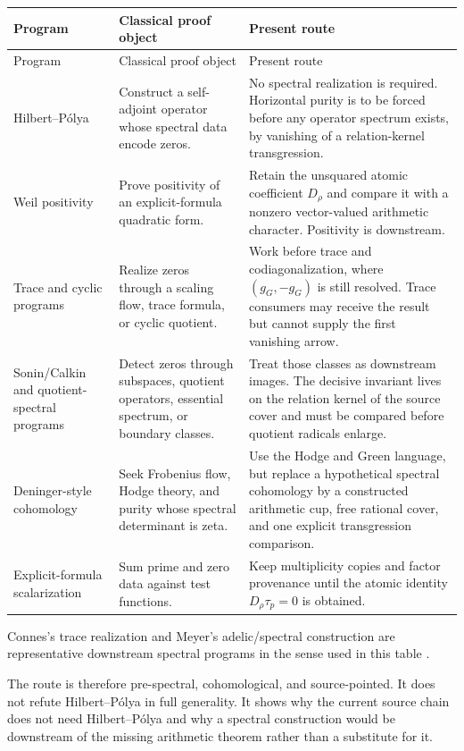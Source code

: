 \documentclass[11pt]{article}
\theoremstyle{definition}
\theoremstyle{remark}
\numberwithin{equation}{section}
\begin{document}
\begin{longtable}{>{\raggedright\arraybackslash}p{}
                  >{\raggedright\arraybackslash}p{}
                  >{\raggedright\arraybackslash}p{}}
\toprule
Program & Classical proof object & Present route \\
\midrule
\endfirsthead
\toprule
Program & Classical proof object & Present route \\
\midrule
\endhead
Hilbert--P\'olya & Construct a self-adjoint operator whose spectral data
encode zeros. & No spectral realization is required.  Horizontal purity is
to be forced before any operator spectrum exists, by vanishing of a
relation-kernel transgression.\\
Weil positivity & Prove positivity of an explicit-formula quadratic form. &
Retain the unsquared atomic coefficient $D_\rho$ and compare it with a
nonzero vector-valued arithmetic character.  Positivity is downstream.\\
Trace and cyclic programs & Realize zeros through a scaling flow, trace
formula, or cyclic quotient. & Work before trace and codiagonalization,
where $(g_G,-g_G)$ is still resolved.  Trace consumers may receive the
result but cannot supply the first vanishing arrow.\\
Sonin/Calkin and quotient-spectral programs & Detect zeros through
subspaces, quotient operators, essential spectrum, or boundary classes. &
Treat those classes as downstream images.  The decisive invariant lives on
the relation kernel of the source cover and must be compared before quotient
radicals enlarge.\\
Deninger-style cohomology & Seek Frobenius flow, Hodge theory, and purity
whose spectral determinant is zeta. & Use the Hodge and Green language, but
replace a hypothetical spectral cohomology by a constructed arithmetic cup,
free rational cover, and one explicit transgression comparison.\\
Explicit-formula scalarization & Sum prime and zero data against test
functions. & Keep multiplicity copies and factor provenance until the
atomic identity $D_\rho\tau_p=0$ is obtained.\\
\bottomrule
\end{longtable}

Connes's trace realization and Meyer's adelic/spectral construction are
representative downstream spectral programs in the sense used in this
table \cite{Connes1999,Meyer2005}.

The route is therefore pre-spectral, cohomological, and source-pointed.  It
does not refute Hilbert--P\'olya in full generality.  It shows why the current
source chain does not need Hilbert--P\'olya and why a spectral construction
would be downstream of the missing arithmetic theorem rather than a
substitute for it.
\end{document}
